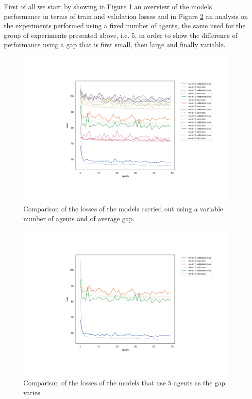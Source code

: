 First of all we start by showing in Figure \ref{fig:distlossext} an overview of the 
models performance in terms of train and validation losses and in Figure 
\ref{fig:distlossn5} an analysis on the experiments performed using a fixed 
number of agents, the same used for the group of experiments presented above, 
i.e. $5$, in order to show the difference of performance using a gap that is first 
small, then large and finally variable.
\begin{figure}[!htb]
	\centering
	\includegraphics[width=.8\textwidth]{contents/images/task1-extension/loss-distributed-all@}%
	\caption[Comparison of losses of the second set of 
	experiments.]{Comparison of the losses of the models carried out using a 
	variable number of agents and of average gap.}
	\label{fig:distlossext}
\end{figure}
\begin{figure}[!htb]
	\centering
	\includegraphics[width=.8\textwidth]{contents/images/task1-extension/loss-distributed-N5@}%
	\caption{Comparison of the losses of the models that use $5$ agents as the gap 
	varies.}
	\label{fig:distlossn5}
\end{figure}

